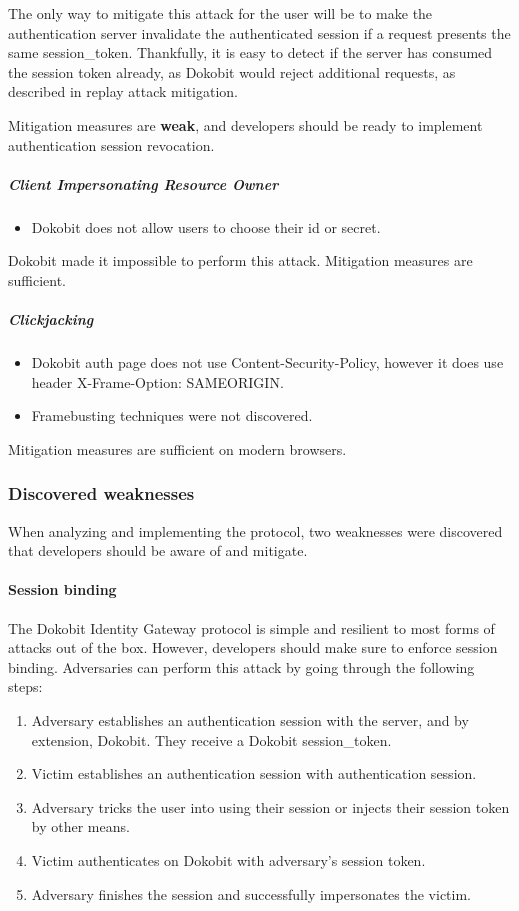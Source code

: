 The only way to mitigate this attack for the user will be to make the authentication server invalidate the authenticated session if a request presents the same session\_token. Thankfully, it is easy to detect if the server has consumed the session token already, as Dokobit would reject additional requests, as described in replay attack mitigation.

Mitigation measures are \textbf{weak}, and developers should be ready to implement authentication session revocation.

\subparagraph{Client Impersonating Resource Owner}

\begin{itemize}
  \item Dokobit does not allow users to choose their id or secret.
\end{itemize}

Dokobit made it impossible to perform this attack. Mitigation measures are sufficient.

\subparagraph{Clickjacking}

\begin{itemize}
  \item Dokobit auth page does not use Content-Security-Policy, however it does use header X-Frame-Option: {SAMEORIGIN}.
  \item Framebusting \cite{RYDSTEDT2010BUSTI} techniques were not discovered.
\end{itemize}

Mitigation measures are sufficient on modern browsers.

\subsubsection{Discovered weaknesses}

When analyzing and implementing the protocol, two weaknesses were discovered that developers should be aware of and mitigate.

\paragraph{Session binding}


The Dokobit Identity Gateway protocol is simple and resilient to most forms of attacks out of the box. However, developers should make sure to enforce session binding. Adversaries can perform this attack by going through the following steps:

\begin{enumerate}
  \item Adversary establishes an authentication session with the server, and by extension, Dokobit. They receive a Dokobit session\_token.
  \item Victim establishes an authentication session with authentication session.
  \item Adversary tricks the user into using their session or injects their session token by other means.
  \item Victim authenticates on Dokobit with adversary's session token.
  \item Adversary finishes the session and successfully impersonates the victim. 
\end{enumerate}

